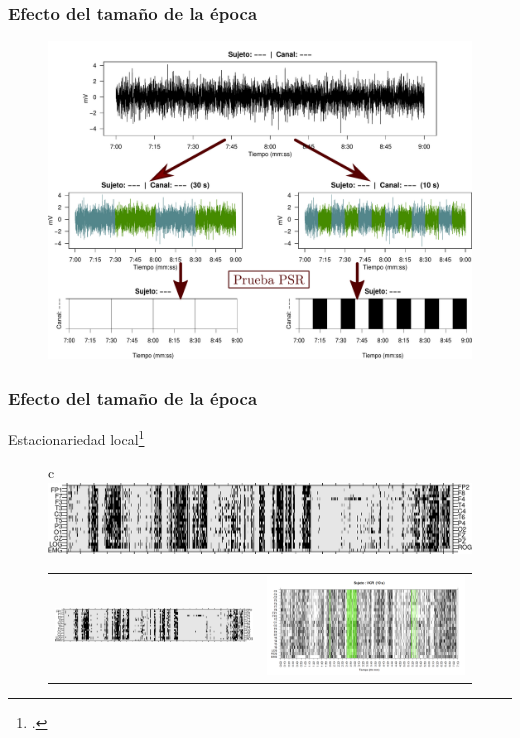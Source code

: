 \documentclass[serif,mathserif,professionalfont]{beamer}
\begin{document}
\begin{frame}\frametitle{Efecto del tamaño de la época}
\begin{figure}
\centering
\includegraphics[width=0.9\linewidth]{./img_diagramas/epocas_diferentes.pdf}
\end{figure}
\end{frame}


\begin{frame}\frametitle{Efecto del tamaño de la época}
{\small Estacionariedad local\footcite{Cohen77}}
\begin{figure}
\centering
\begin{tabular}{c}
\includegraphics[width=0.4\linewidth]
{./img_ejemplos/VCNNS1_est_30.png} \\
\begin{tabular}{cc}
\includegraphics[width=0.4\linewidth]
{./img_ejemplos/VCNNS1_est_60.png} 
&
\includegraphics[width=0.4\linewidth]
{./img_ejemplos/VCNNS1_est_10.png} 
\end{tabular}
\end{tabular}
\end{figure}
\end{frame}
\end{document}
